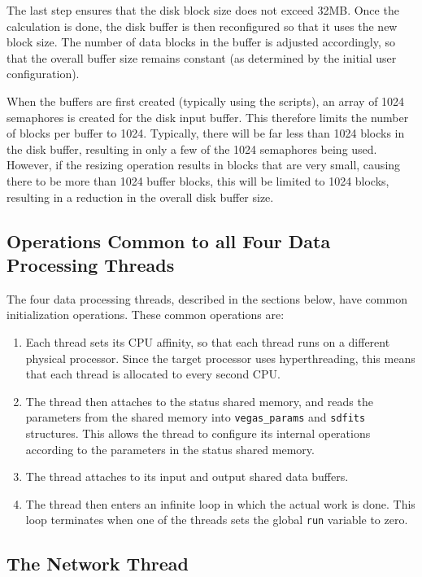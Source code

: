 \documentclass[11pt]{article} %
\begin{document}
The last step ensures that the disk block size does not exceed 32MB. Once the calculation is done, the disk buffer is then reconfigured so that it uses the new block size. The number of data blocks in the buffer is adjusted accordingly, so that the overall buffer size remains constant (as determined by the initial user configuration).

When the buffers are first created (typically using the scripts), an array of 1024 semaphores is created for the disk input buffer. This therefore limits the number of blocks per buffer to 1024. Typically, there will be far less than 1024 blocks in the disk buffer, resulting in only a few of the 1024 semaphores being used. However, if the resizing operation results in blocks that are very small, causing there to be more than 1024 buffer blocks, this will be limited to 1024 blocks, resulting in a reduction in the overall disk buffer size.

\subsection{Operations Common to all Four Data Processing Threads}

The four data processing threads, described in the sections below, have common initialization operations. These common operations are:

\begin{enumerate}
\item Each thread sets its CPU affinity, so that each thread runs on a different physical processor. Since the target processor uses hyperthreading, this means that each thread is allocated to every second CPU.
\item The thread then attaches to the status shared memory, and reads the parameters from the shared memory into \texttt{vegas\_params} and \texttt{sdfits} structures. This allows the thread to configure its internal operations according to the parameters in the status shared memory.
\item The thread attaches to its input and output shared data buffers.
\item The thread then enters an infinite loop in which the actual work is done. This loop terminates when one of the threads sets the global \texttt{run} variable to zero.
\end{enumerate}

\subsection{The Network Thread}
\end{document}
